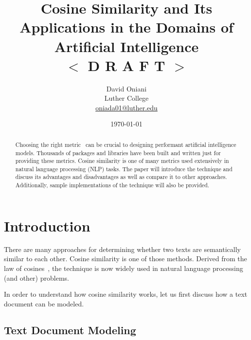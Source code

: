 \documentclass[11pt]{article}
\author{David Oniani\\
        Luther College\\
        \href{mailto:oniada01@luther.edu}{oniada01@luther.edu}}
\title{\textbf{Cosine Similarity and Its Applications in the Domains of
  Artificial Intelligence}\\\color{black!50!blue}$<$ D R A F T $>$}
\date{\today}
\begin{document}
\maketitle


\begin{abstract}
  \noindent Choosing the right metric~\cite{thomas2020} can be crucial to
  designing performant artificial intelligence models. Thousands of packages
  and libraries have been built and written just for providing these metrics.
  Cosine similarity is one of many metrics used extensively in natural language
  processing (NLP) tasks. The paper will introduce the technique and discuss
  its advantages and disadvantages as well as compare it to other approaches.
  Additionally, sample implementations of the technique will also be provided.
\end{abstract}


\newpage
\tableofcontents
\newpage


\section{Introduction}

There are many approaches for determining whether two texts are semantically
similar to each other. Cosine similarity is one of those methods. Derived from
the law of cosines~\cite{wikicosineproof}, the technique is now widely used in
natural language processing (and other) problems.

\bigskip

In order to understand how cosine similarity works, let us first discuss how a
text document can be modeled.

\subsection{Text Document Modeling}
\end{document}
